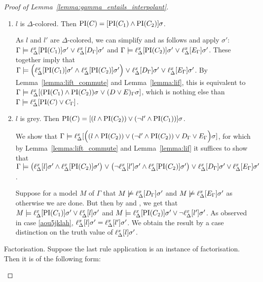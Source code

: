 \begin{proof}[Proof of Lemma~\ref{lemma:gamma_entails_interpolant}]
\begin{description}
\begin{enumerate}
				\item $l$ is $\Delta$-colored. Then $\operatorname{PI}(C) = [\operatorname{PI}(C_1) \land \operatorname{PI}(C_2)]\sigma$.

					As $l$ and $l'$ are $\Delta$-colored, we can simplify \markA{} and \markB{} as follows and apply $\sigma'$:
					$\Gamma \models \ell_{\Delta}^{x}[\operatorname{PI}(C_1)]\sigma' \;{\lor}\; \ell_{\Delta}^{x}[D_\Gamma]\sigma' $ and $\Gamma \models \ell_{\Delta}^{x}[\operatorname{PI}(C_2)]\sigma' \;{\lor}\; \ell_{\Delta}^{x}[E_\Gamma]\sigma'$.
					These together imply that 
					$\Gamma \models \Big(\ell_{\Delta}^{x}[\operatorname{PI}(C_1)]\sigma' \;{\land}\; \ell_{\Delta}^{x}[\operatorname{PI}(C_2)]\sigma'\Big) \;{\lor}\; \ell_{\Delta}^{x}[D_\Gamma]\sigma' \;{\lor}\; \ell_{\Delta}^{x}[E_\Gamma]\sigma'$.
					By Lemma~\ref{lemma:lift_commute} and Lemma~\ref{lemma:lif}, this is equivalent to 
					$\Gamma \models \ell_{\Delta}^{x}[(\operatorname{PI}(C_1) \land \operatorname{PI}(C_2))\sigma \;{\lor}\; (D \lor E)_\Gamma\sigma]$, which is nothing else than
					$\Gamma \models \ell_{\Delta}^{x}[\operatorname{PI}(C) \lor C_\Gamma]$.

				\item $l$ is grey. Then $\operatorname{PI}(C) = [(l \land \operatorname{PI}(C_2) ) \lor (\lnot l' \land \operatorname{PI}(C_1))]\sigma$.

					We show that $\Gamma \models\allowbreak \ell_{\Delta}^{x}[ \Big((l \land \operatorname{PI}(C_2) ) \lor\allowbreak (\lnot l' \land \operatorname{PI}(C_2)) \lor D_\Gamma \lor E_\Gamma\Big)\sigma]$, for which by Lemma~\ref{lemma:lift_commute} and Lemma~\ref{lemma:lif} it suffices to show that 
					$\Gamma \models\allowbreak \big(\ell_{\Delta}^{x}[l]\sigma' \land \ell_{\Delta}^{x}[\operatorname{PI}(C_2)]\sigma'\big)\;{\lor}\;\allowbreak \big(\lnot \ell_{\Delta}^{x}[l']\sigma' \land \ell_{\Delta}^{x}[\operatorname{PI}(C_2)]\sigma'\big)\;{\lor}\;\allowbreak \ell_{\Delta}^{x}[D_\Gamma]\sigma' \lor \ell_{\Delta}^{x}[E_\Gamma]\sigma'$.

					Suppose for a model $M$ of $\Gamma$ that  $M \not\models \ell_{\Delta}^{x}[D_\Gamma]\sigma'$ and $M\not\models \ell_{\Delta}^{x}[E_\Gamma]\sigma'$ as otherwise we are done.
					But then by \markA{} and \markB{}, we get that 
					$M \models \ell_{\Delta}^{x}[\operatorname{PI}(C_1)]\sigma' \lor \ell_{\Delta}^{x}[l]\sigma'$ and
					$M \entails\nolinebreak \lifdelta{\PI(C_2)}\sigma' \lor \lnot\lifdelta{l'}\sigma'$.
					As observed in case \ref{aou5jklah}, $\ell_{\Delta}^{x}[l]\sigma' = \ell_{\Delta}^{x}[l']\sigma'$.
					We obtain the result by a case distinction on the truth value of $\ell_{\Delta}^{x}[l]\sigma'$.

			\end{enumerate}

		\item{Factorisation.}
			Suppose the last rule application is an instance of factorisation. Then it is of the following form:
			\begin{prooftree}
			\end{prooftree}


\end{description}
\end{proof}
